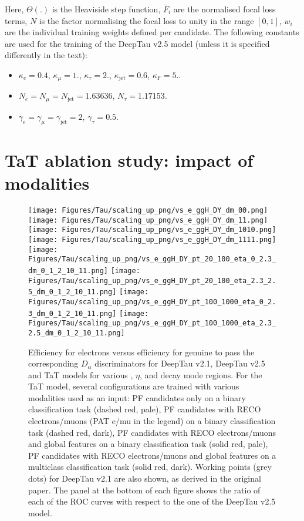 Here, $\Theta(.)$ is the Heaviside step function, $\bar{F}_i$ are the normalised focal loss terms, $N$ is the factor normalising the focal loss to unity in the range $[0,1]$, $w_i$ are the individual training weights defined per \tauh candidate. The following constants are used for the training of the DeepTau v2.5 model (unless it is specified differently in the text):
\begin{itemize}
    \item $\kappa_e = 0.4$, $\kappa_\mu = 1.$, $\kappa_\tau = 2.$, $\kappa_\text{jet} = 0.6$, $\kappa_F = 5.$.
    \item $N_e = N_\mu = N_\text{jet} = 1.63636$, $N_\tau = 1.17153$.
    \item $\gamma_e = \gamma_\mu = \gamma_\text{jet} = 2$, $\gamma_\tau = 0.5$.
\end{itemize}



\newpage
\section{TaT ablation study: impact of modalities}\label{app:tat-add}

\begin{figure}[H]
    \centering
    \texttt{[image: Figures/Tau/scaling\_up\_png/vs\_e\_ggH\_DY\_dm\_00.png]}
    \texttt{[image: Figures/Tau/scaling\_up\_png/vs\_e\_ggH\_DY\_dm\_11.png]}
    \texttt{[image: Figures/Tau/scaling\_up\_png/vs\_e\_ggH\_DY\_dm\_1010.png]}
    \texttt{[image: Figures/Tau/scaling\_up\_png/vs\_e\_ggH\_DY\_dm\_1111.png]}
    \texttt{[image: Figures/Tau/scaling\_up\_png/vs\_e\_ggH\_DY\_pt\_20\_100\_eta\_0\_2.3\_dm\_0\_1\_2\_10\_11.png]}
    \texttt{[image: Figures/Tau/scaling\_up\_png/vs\_e\_ggH\_DY\_pt\_20\_100\_eta\_2.3\_2.5\_dm\_0\_1\_2\_10\_11.png]}
    \texttt{[image: Figures/Tau/scaling\_up\_png/vs\_e\_ggH\_DY\_pt\_100\_1000\_eta\_0\_2.3\_dm\_0\_1\_2\_10\_11.png]}
    \texttt{[image: Figures/Tau/scaling\_up\_png/vs\_e\_ggH\_DY\_pt\_100\_1000\_eta\_2.3\_2.5\_dm\_0\_1\_2\_10\_11.png]}
    \caption{Efficiency for electrons versus efficiency for genuine \tauh to pass the corresponding $D_\alpha$ discriminators for DeepTau v2.1, DeepTau v2.5 and TaT models for various \pt, $\eta$, and \tauh decay mode regions. For the TaT model, several configurations are trained with various modalities used as an input: PF candidates only on a binary classification task (dashed red, pale), PF candidates with RECO electrons/muons (PAT e/mu in the legend) on a binary classification task (dashed red, dark), PF candidates with RECO electrons/muons and global features on a binary classification task (solid red, pale), PF candidates with RECO electrons/muons and global features on a multiclass classification task (solid red, dark). Working points (grey dots) for DeepTau v2.1 are also shown, as derived in the original paper. The panel at the bottom of each figure shows the ratio of each of the ROC curves with respect to the one of the DeepTau v2.5 model.}
\end{figure}


